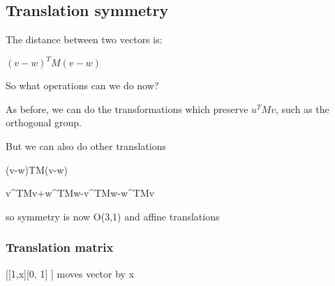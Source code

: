 
\subsection{Translation symmetry}

The distance between two vectors is:

\((v-w)^TM(v-w)\)

So what operations can we do now?

As before, we can do the transformations which preserve \(u^TMv\), such as the orthogonal group.

But we can also do other translations

(v-w)TM(v-w)

v^TMv+w^TMw-v^TMw-w^TMv

so symmetry is now O(3,1) and affine translations

\subsubsection{Translation matrix}

[[1,x][0, 1] ] moves vector by x


